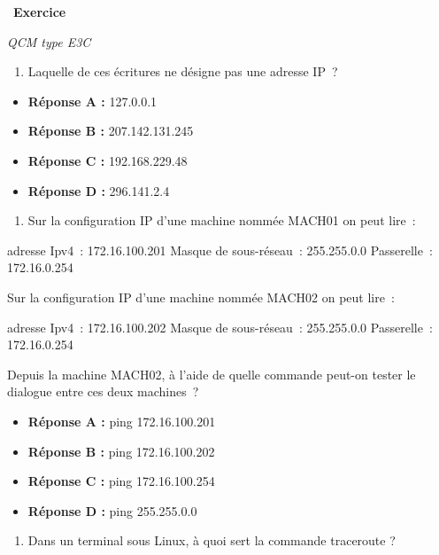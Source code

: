 \documentclass[
  11pt,
]{article}
\providecommand{\tightlist}{%
  \setlength{\itemsep}{0pt}\setlength{\parskip}{0pt}}
\newcounter{exo}
\newenvironment{exercice}[1]
{\par \medskip   \addtocounter{exo}{1} \noindent  
\begin{bclogo}[arrondi =0.1,   noborder = true, logo=\bccrayon, marge=4]{~\textbf{Exercice} \textbf{\theexo} {\itshape #1} }  \par}
{
\end{bclogo}
 \par \bigskip }
\newcounter{def}
\begin{document}
\begin{exercice}{}

\emph{QCM type E3C}

\begin{enumerate}
\def\labelenumi{\arabic{enumi}.}
\tightlist
\item
  Laquelle de ces écritures ne désigne pas une adresse IP~?
\end{enumerate}

\begin{itemize}
\tightlist
\item
  \textbf{Réponse A :} 127.0.0.1
\item
  \textbf{Réponse B :} 207.142.131.245
\item
  \textbf{Réponse C :} 192.168.229.48
\item
  \textbf{Réponse D :} 296.141.2.4
\end{itemize}

\begin{enumerate}
\def\labelenumi{\arabic{enumi}.}
\setcounter{enumi}{1}
\tightlist
\item
  Sur la configuration IP d'une machine nommée MACH01 on peut lire~:
\end{enumerate}

adresse Ipv4~: 172.16.100.201 Masque de sous-réseau~: 255.255.0.0
Passerelle~: 172.16.0.254

Sur la configuration IP d'une machine nommée MACH02 on peut lire~:

adresse Ipv4~: 172.16.100.202 Masque de sous-réseau~: 255.255.0.0
Passerelle~: 172.16.0.254

Depuis la machine MACH02, à l'aide de quelle commande peut-on tester le
dialogue entre ces deux machines~?

\begin{itemize}
\tightlist
\item
  \textbf{Réponse A :} ping 172.16.100.201
\item
  \textbf{Réponse B :} ping 172.16.100.202
\item
  \textbf{Réponse C :} ping 172.16.100.254
\item
  \textbf{Réponse D :} ping 255.255.0.0
\end{itemize}

\begin{enumerate}
\def\labelenumi{\arabic{enumi}.}
\setcounter{enumi}{2}
\tightlist
\item
  Dans un terminal sous Linux, à quoi sert la commande traceroute ?
\end{enumerate}


\end{exercice}
\end{document}
